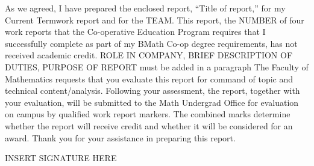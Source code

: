 \documentclass[12pt]{article}
\newcommand{\term}{Current Term} %
\newcommand{\WTT}{Title of report}
\begin{document}




\FirstPage

\newpage




\LetterHead



As we agreed, I have prepared the enclosed report, “\WTT,” for
my \term work report and for the TEAM. This
report, the NUMBER of four work reports that the Co-operative Education Program
requires that I successfully complete as part of my BMath Co-op degree
requirements, has not received academic credit.
\vskip 10pt
ROLE IN COMPANY, BRIEF DESCRIPTION OF DUTIES, PURPOSE OF REPORT must be added in a paragraph
\vskip 10pt 
The Faculty of Mathematics requests that you evaluate this report for command
of topic and technical content/analysis. Following your assessment, the report,
together with your evaluation, will be submitted to the Math Undergrad Office
for evaluation on campus by qualified work report markers. The combined
marks determine whether the report will receive credit and whether it will be
considered for an award.
Thank you for your assistance in preparing this report.

INSERT SIGNATURE HERE






\newpage
\pageFormatting
\tableofcontents
\listoffigures %






\end{document}
